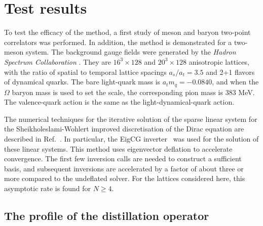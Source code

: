 \section{Test results\label{sec:results}}

To test the efficacy of the method, a first study of meson and baryon two-point
correlators was
performed. In addition, the method is demonstrated for a two-meson system.
The background gauge fields were generated by the {\em Hadron
Spectrum Collaboration} \cite{Edwards:2008ja,Lin:2008pr}. They are $16^3 \times 128$
and $20^3 \times 128$ anisotropic lattices, with the ratio of spatial to
temporal lattice spacings $a_s/a_t=3.5$ and 2+1 flavors of dynamical quarks.
The bare light-quark mass is $a_t m_q=-0.0840$, and when the $\Omega$ baryon
mass is used to set the scale, the corresponding pion mass is $383$ MeV.
The valence-quark action is the same as the light-dynamical-quark
action.

The numerical techniques for the iterative solution of the sparse linear system
for the Sheikholeslami-Wohlert improved discretisation of the Dirac equation
are described in Ref.~\cite{Edwards:2008ja}.  In particular, the EigCG
inverter~\cite{Stathopoulos:2007zi} was used for the solution of these linear
systems.
This method uses eigenvector deflation to accelerate convergence.
The first few inversion calls are needed to construct a sufficient basis, and
subsequent inversions are accelerated by a factor of about three or more
compared to the undeflated solver. For the lattices considered here, this
asymptotic rate is found for $N\ge 4$.
\label{subsec:results-intro}

\subsection{The profile of the distillation operator}
    \label{subsec:results-wavefn}

